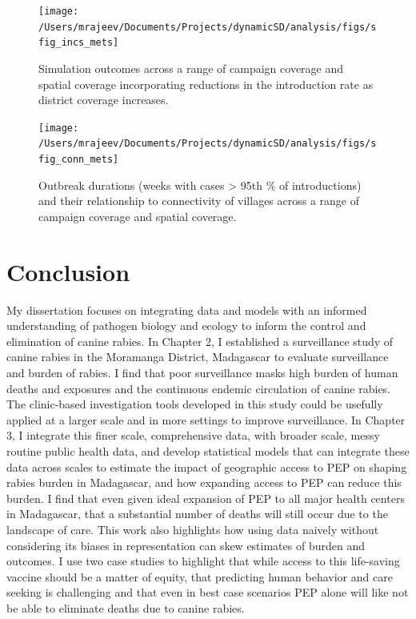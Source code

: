 \documentclass[
  oneside]{book}
\begin{document}
\begin{figure}
\texttt{[image: /Users/mrajeev/Documents/Projects/dynamicSD/analysis/figs/sfig\_incs\_mets]} \caption{Simulation outcomes across a range of campaign coverage and spatial coverage incorporating reductions in the introduction rate as district coverage increases.}\label{fig:sfig-incs-mets}
\end{figure}



\begin{figure}
\texttt{[image: /Users/mrajeev/Documents/Projects/dynamicSD/analysis/figs/sfig\_conn\_mets]} \caption{Outbreak durations (weeks with cases \textgreater{} 95th \% of introductions) and their relationship to connectivity of villages across a range of campaign coverage and spatial coverage.}\label{fig:sfig-conn-mets}
\end{figure}



\hypertarget{conclusion-1}{%
\chapter{Conclusion}\label{conclusion-1}}

\setlength{\parskip}{2em}

My dissertation focuses on integrating data and models with an informed understanding of pathogen biology and ecology to inform the control and elimination of canine rabies. In Chapter 2, I established a surveillance study of canine rabies in the Moramanga District, Madagascar to evaluate surveillance and burden of rabies. I find that poor surveillance masks high burden of human deaths and exposures and the continuous endemic circulation of canine rabies. The clinic-based investigation tools developed in this study could be usefully applied at a larger scale and in more settings to improve surveillance. In Chapter 3, I integrate this finer scale, comprehensive data, with broader scale, messy routine public health data, and develop statistical models that can integrate these data across scales to estimate the impact of geographic access to PEP on shaping rabies burden in Madagascar, and how expanding access to PEP can reduce this burden. I find that even given ideal expansion of PEP to all major health centers in Madagascar, that a substantial number of deaths will still occur due to the landscape of care. This work also highlights how using data naively without considering its biases in representation can skew estimates of burden and outcomes. I use two case studies to highlight that while access to this life-saving vaccine should be a matter of equity, that predicting human behavior and care seeking is challenging and that even in best case scenarios PEP alone will like not be able to eliminate deaths due to canine rabies.
\end{document}
